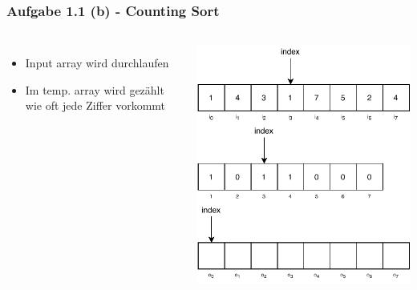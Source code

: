 \documentclass[aspectratio=169]{beamer}
\begin{document}
\begin{frame}
	\frametitle{Aufgabe 1.1 (b) - Counting Sort}
	\begin{columns}[c] %
	
	\begin{itemize}
		\item Input array wird durchlaufen
		\item Im temp. array wird gezählt wie oft jede Ziffer vorkommt
	\end{itemize}
	
	\includegraphics[scale=.7]{cs3.pdf}
	
	\end{columns}
	\end{frame}
\end{document}
